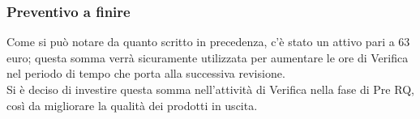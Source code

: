 \subsubsection{Preventivo a finire}
Come si può notare da quanto scritto in precedenza, c'è stato un attivo pari a 63 euro; questa somma verrà sicuramente utilizzata per aumentare le ore di Verifica nel periodo di tempo che porta alla successiva revisione.\\
Si è deciso di investire questa somma nell'attività di Verifica nella fase di Pre RQ, così da migliorare la qualità dei prodotti in uscita.
